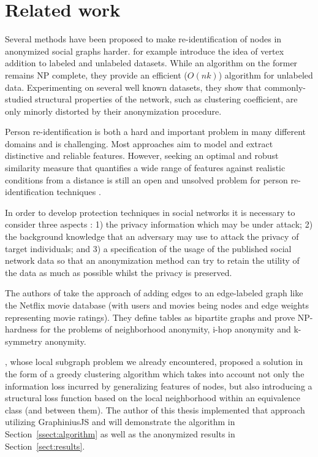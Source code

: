 \documentclass{llncs}
\begin{document}
\section{Related work}
\label{sect:related_work}


Several methods have been proposed to make re-identification of nodes in anonymized social graphs harder.	\cite{chester2011k} for example introduce the idea of vertex addition to labeled and unlabeled datasets. While an algorithm on the former remains NP complete, they provide an efficient ($O(nk)$) algorithm for unlabeled data. Experimenting on several well known datasets, they show that commonly-studied structural properties of the network, such as clustering coefficient, are only minorly distorted by their anonymization procedure.

Person re-identification is both a hard and important problem in many different domains and is challenging. Most approaches aim to model and extract distinctive and reliable features. However, seeking an optimal and robust similarity measure that quantifies a wide range of features against realistic conditions from a distance is still an open and unsolved problem for person re-identification techniques \cite{Zheng:2013:reidentification}. 

In order to develop protection techniques in social networks it is necessary to consider three aspects \cite{Zhou:2008:SurveyAnonNetwork}: 1) the privacy information which may be
under attack; 2) the background knowledge that an adversary may use to attack the privacy
of target individuals; and 3) a specification of the usage of the published social network data so that an anonymization method can try to retain the utility of the data as much as possible whilst the privacy is preserved. 

The authors of \cite{kapron2011social} take the approach of adding edges to an edge-labeled graph like the Netflix movie database (with users and movies being nodes and edge weights representing movie ratings). They define tables as bipartite graphs and prove NP-hardness for the problems of neighborhood anonymity, i-hop anonymity and k-symmetry anonymity.

\cite{campan2009data}, whose local subgraph problem we already encountered, proposed a solution in the form of a greedy clustering algorithm which takes into account not only the information loss incurred by generalizing features of nodes, but also introducing a structural loss function based on the local neighborhood within an equivalence class (and between them). The author of this thesis implemented that approach utilizing GraphiniusJS and will demonstrate the algorithm in Section~\ref{ssect:algorithm} as well as the anonymized results in Section~\ref{sect:results}.
\end{document}
